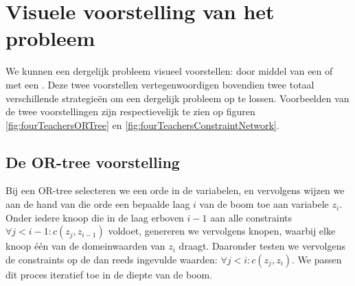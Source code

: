 \section{Visuele voorstelling van het probleem}
We kunnen een dergelijk probleem visueel voorstellen: door middel van een  of met een . Deze twee voorstellen vertegenwoordigen bovendien twee totaal verschillende strategie\"en om een dergelijk probleem op te lossen. Voorbeelden van de twee voorstellingen zijn respectievelijk te zien op figuren \ref{fig:fourTeachersORTree} en \ref{fig:fourTeachersConstraintNetwork}.
\subsection{De OR-tree voorstelling}
Bij een OR-tree selecteren we een orde in de variabelen, en vervolgens wijzen we aan de hand van die orde een bepaalde laag $i$ van de boom toe aan variabele $z_i$. Onder iedere knoop die in de laag erboven $i-1$ aan alle constraints $\forall j<i-1: c\left(z_j,z_{i-1}\right)$ voldoet, genereren we vervolgens knopen, waarbij elke knoop \'e\'en van de domeinwaarden van $z_i$ draagt. Daaronder testen we vervolgens de constraints op de dan reeds ingevulde waarden: $\forall j<i: c\left(z_j,z_{i}\right)$. We passen dit proces iteratief toe in de diepte van de boom.
